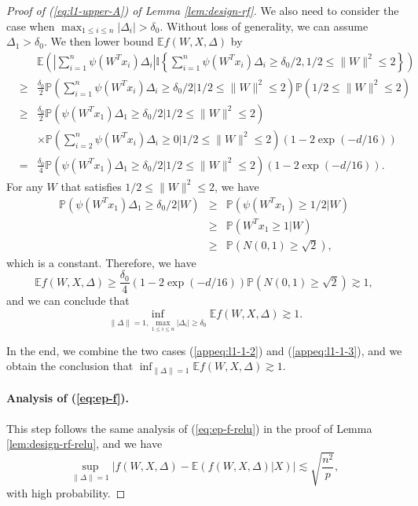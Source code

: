 \begin{proof}[Proof of (\ref{eq:l1-upper-A}) of Lemma \ref{lem:design-rf}]
We also need to consider the case when $\max_{1\leq i\leq n}|\Delta_i|> \delta_0$. Without loss of generality, we can assume $\Delta_1>\delta_0$.
We then lower bound $\mathbb{E}f(W,X,\Delta)$ by
\begin{eqnarray*}
&& \mathbb{E}\left(\left|\sum_{i=1}^n\psi(W^Tx_i)\Delta_i\right|\mathbb{I}\left\{\sum_{i=1}^n\psi(W^Tx_i)\Delta_i \geq \delta_0/2, 1/2\leq \|W\|^2\leq 2\right\}\right) \\
&\geq& \frac{\delta_0}{2} \mathbb{P}\left(\sum_{i=1}^n\psi(W^Tx_i)\Delta_i \geq \delta_0/2\Big| 1/2\leq \|W\|^2\leq 2\right)\mathbb{P}\left(1/2\leq \|W\|^2\leq 2\right) \\
&\geq& \frac{\delta_0}{2} \mathbb{P}\left(\psi(W^Tx_1)\Delta_1 \geq \delta_0/2\Big|1/2\leq \|W\|^2\leq 2\right) \\
&& \times \mathbb{P}\left(\sum_{i=2}^n\psi(W^Tx_i)\Delta_i \geq 0\Big|1/2\leq \|W\|^2\leq 2\right)\left(1-2\exp(-d/16)\right) \\
&=& \frac{\delta_0}{4} \mathbb{P}\left(\psi(W^Tx_1)\Delta_1 \geq \delta_0/2\Big|1/2\leq \|W\|^2\leq 2\right)\left(1-2\exp(-d/16)\right).
\end{eqnarray*}
For any $W$ that satisfies $1/2\leq \|W\|^2\leq 2$, we have
\begin{eqnarray*}
\mathbb{P}\left(\psi(W^Tx_1)\Delta_1 \geq \delta_0/2\Big|W\right) &\geq& \mathbb{P}\left(\psi(W^Tx_1)\geq 1/2\Big|W\right) \\
&\geq&  \mathbb{P}\left(W^Tx_1\geq 1\Big|W\right) \\
&\geq& \mathbb{P}\left(N(0,1)\geq \sqrt{2}\right),
\end{eqnarray*}
which is a constant.
Therefore, we have
$$\mathbb{E}f(W,X,\Delta)\geq \frac{\delta_0}{4}\left(1-2\exp(-d/16)\right)\mathbb{P}\left(N(0,1)\geq \sqrt{2}\right)\gtrsim 1,$$
and we can conclude that
\begin{equation}
\inf_{\|\Delta\|=1, \max_{1\leq i\leq n}|\Delta_i|\geq\delta_0}\mathbb{E}f(W,X,\Delta) \gtrsim 1.\label{appeq:l1-1-3}
\end{equation}

In the end, we combine the two cases (\ref{appeq:l1-1-2}) and (\ref{appeq:l1-1-3}),  and we obtain the conclusion that $\inf_{\|\Delta\|=1}\mathbb{E}f(W,X,\Delta)\gtrsim 1$.


\paragraph{Analysis of (\ref{eq:ep-f}).} This step follows the same analysis of (\ref{eq:ep-f-relu}) in the proof of Lemma \ref{lem:design-rf-relu}, and we have
$$\sup_{\|\Delta\|=1}\left|f(W,X,\Delta)-\mathbb{E}(f(W,X,\Delta)|X)\right|\lesssim \sqrt{\frac{n^2}{p}},$$
with high probability.


\end{proof}
